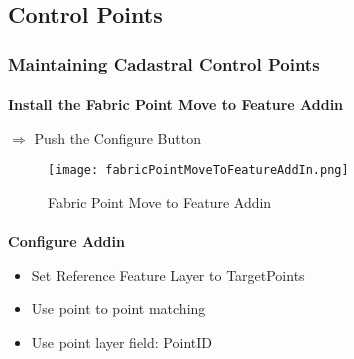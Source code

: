 \documentclass[class=article , crop=false, titlepage, twoside, multi={itemize, figure, verbatim}, float=false]{standalone}
\title{}  %
\begin{document}

\ifstandalone
\maketitle %
\tableofcontents %
\clearpage
\fi

\subsection{Control Points}
\medskip
\subsubsection[Editing Control Points]{Maintaining Cadastral Control Points}
\vspace{.1in}

\paragraph[Fabric Point Move to Feature Addin]{}\textbf{{\Large Install the Fabric Point Move to Feature Addin}}
\vspace{.1in}

{\Large $\Rightarrow$ Push the Configure Button}

\begin{figure}[h!]
\centering
    \texttt{[image: fabricPointMoveToFeatureAddIn.png]}

\caption{Fabric Point Move to Feature Addin}
\end{figure}
%
%
\paragraph[Configure Addin]{}\textbf{\Large Configure Addin}
\vspace{.1in}

\begin{itemize}

\item Set Reference Feature Layer to TargetPoints
\item Use point to point matching
\item Use point layer field: PointID
\end{itemize}
\end{document}
